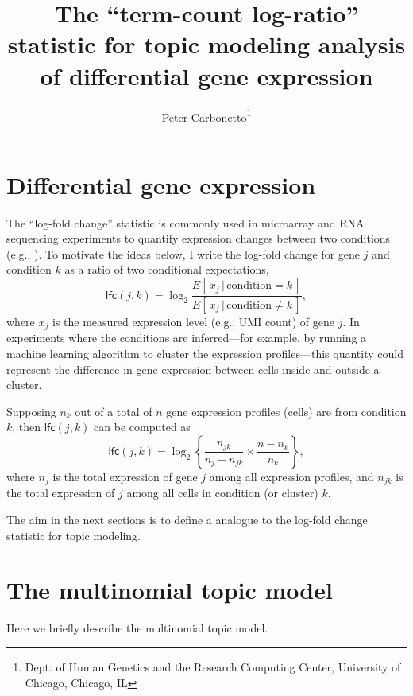\documentclass[final]{siamart171218}
\title{The ``term-count log-ratio'' statistic for topic modeling analysis
  of differential gene expression}
\author{Peter Carbonetto\thanks{Dept. of Human Genetics and the Research Computing Center, University of Chicago, Chicago, IL}}
\begin{document}
\maketitle

\section{Differential gene expression}

The ``log-fold change'' statistic is commonly used in microarray and
RNA sequencing experiments to quantify expression changes between two
conditions (e.g., \cite{cui-churchill-2003, quackenbush-2002}). To
motivate the ideas below, I write the log-fold change for gene $j$
and condition $k$ as a ratio of two conditional expectations,
\begin{equation}
\mathsf{lfc}(j,k) = \log_2 \frac{E[\,x_j \,|\, \mathrm{condition} = k\,]}
                                {E[\,x_j \,|\, \mathrm{condition} \neq k\,]},
\end{equation}
where $x_j$ is the measured expression level (e.g., UMI count) of gene
$j$. In experiments where the conditions are inferred---for example,
by running a machine learning algorithm to cluster the expression
profiles---this quantity could represent the difference in gene
expression between cells inside and outside a cluster.

Supposing $n_k$ out of a total of $n$ gene expression profiles
(cells) are from condition $k$, then $\mathsf{lfc}(j,k)$ can be
computed as
\begin{equation}
\mathsf{lfc}(j,k) =
\log_2 \left\{\frac{n_{jk}}{n_j - n_{jk}} \times \frac{n - n_k}{n_k} \right\},
\end{equation}
where $n_j$ is the total expression of gene $j$ among all expression
profiles, and $n_{jk}$ is the total expression of $j$ among all cells
in condition (or cluster) $k$.

The aim in the next sections is to define a analogue to the log-fold
change statistic for topic modeling.

\section{The multinomial topic model}

Here we briefly describe the multinomial topic model.
\end{document}
